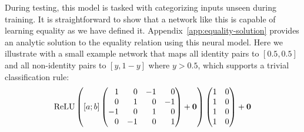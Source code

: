 \documentclass{article}
\newcommand{\Appref}[1]{Appendix~\ref{#1}}
\newcommand{\update}[1]{{\color{darkblue}#1}}
\DeclareMathOperator{\ReLU}{ReLU}
\begin{document}
During testing, this model is tasked with categorizing inputs unseen during training.  It is straightforward to show that a network like this is capable of learning equality as we have defined it. \Appref{app:equality-solution} provides an analytic solution to the equality relation using this neural model.  \update{Here we illustrate with a small example network that maps all identity pairs to $[0.5, 0.5]$ and all non-identity pairs to $[y, 1-y]$ where $y > 0.5$, which supports a trivial classification rule:
%
\setlength{\arraycolsep}{4pt}
\begin{equation}
  \ReLU\left(
    [a;b]
    \left(
      \begin{array}[c]{@{} *{4}{r} @{}}
        1 &  0 &  -1 & 0  \\
        0 &  1 &  0 & -1 \\
        -1 &  0 &  1 & 0  \\
        0 &  -1 &  0 & 1
      \end{array}
    \right)
    +
    \mathbf{0}
  \right)
  \left(
    \begin{array}[c]{@{} r r @{}}
      1 & 0 \\
      1 & 0\\
      1 & 0\\
      1 & 0\\
    \end{array}
  \right)
  +
  \mathbf{0}
\end{equation}}
\end{document}
